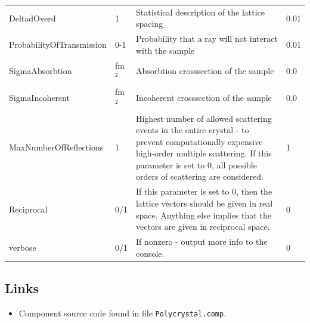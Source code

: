\begin{longtable}{p{}p{}p{}p{}}
DeltadOverd & 1 & Statistical description of the lattice spacing & 0.01 \\
ProbabilityOfTransmission & 0-1 & Probability that a ray will not interact with the sample & 0.01 \\
SigmaAbsorbtion & fm$^{2}$ & Absorbtion crosssection of the sample & 0.0 \\
SigmaIncoherent & fm$^{2}$ & Incoherent crosssection of the sample & 0.0 \\
MaxNumberOfReflections & 1 & Highest number of allowed scattering events in the entire crystal - to prevent computationally expensive high-order multiple scattering. If this parameter is set to 0, all possible orders of scattering are considered. & 1 \\
Reciprocal & 0/1 & If this parameter is set to 0, then the lattice vectors should be given in real space. Anything else implies that the vectors are given in reciprocal space. & 0 \\
verbose & 0/1 & If nonzero - output more info to the console. & 0 \\
\bottomrule
\end{longtable}

\subsection*{Links}
\begin{itemize}
  \item Component source code found in file \texttt{Polycrystal.comp}.
\end{itemize}
